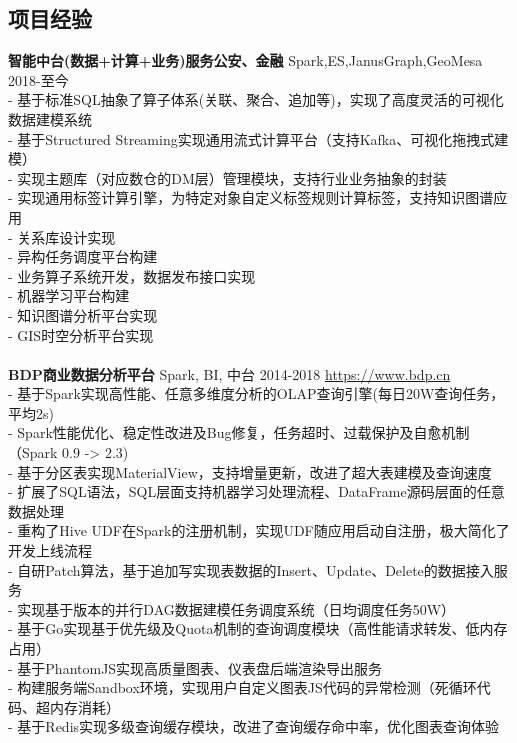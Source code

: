 \documentclass[UTF8,margin,line]{res}
\begin{document}
\begin{resume}
\section{\sc 项目经验}
\textbf{智能中台(数据+计算+业务)服务公安、金融} Spark,ES,JanusGraph,GeoMesa 2018-至今 \\
- 基于标准SQL抽象了算子体系(关联、聚合、追加等)，实现了高度灵活的可视化数据建模系统 \\
- 基于Structured Streaming实现通用流式计算平台（支持Kafka、可视化拖拽式建模） \\
- 实现主题库（对应数仓的DM层）管理模块，支持行业业务抽象的封装 \\
- 实现通用标签计算引擎，为特定对象自定义标签规则计算标签，支持知识图谱应用 \\
- 关系库设计实现 \\
- 异构任务调度平台构建 \\
- 业务算子系统开发，数据发布接口实现 \\
- 机器学习平台构建 \\
- 知识图谱分析平台实现 \\
- GIS时空分析平台实现 \\
\\
\textbf{BDP商业数据分析平台} Spark, BI, 中台 2014-2018 \url{https://www.bdp.cn} \\
- 基于Spark实现高性能、任意多维度分析的OLAP查询引擎(每日20W查询任务，平均2s) \\
- Spark性能优化、稳定性改进及Bug修复，任务超时、过载保护及自愈机制（Spark 0.9 -> 2.3) \\
- 基于分区表实现MaterialView，支持增量更新，改进了超大表建模及查询速度 \\
- 扩展了SQL语法，SQL层面支持机器学习处理流程、DataFrame源码层面的任意数据处理 \\
- 重构了Hive UDF在Spark的注册机制，实现UDF随应用启动自注册，极大简化了开发上线流程 \\
- 自研Patch算法，基于追加写实现表数据的Insert、Update、Delete的数据接入服务 \\
- 实现基于版本的并行DAG数据建模任务调度系统（日均调度任务50W） \\
- 基于Go实现基于优先级及Quota机制的查询调度模块（高性能请求转发、低内存占用） \\
- 基于PhantomJS实现高质量图表、仪表盘后端渲染导出服务 \\
- 构建服务端Sandbox环境，实现用户自定义图表JS代码的异常检测（死循环代码、超内存消耗） \\
- 基于Redis实现多级查询缓存模块，改进了查询缓存命中率，优化图表查询体验 \\

\end{resume}
\end{document}
